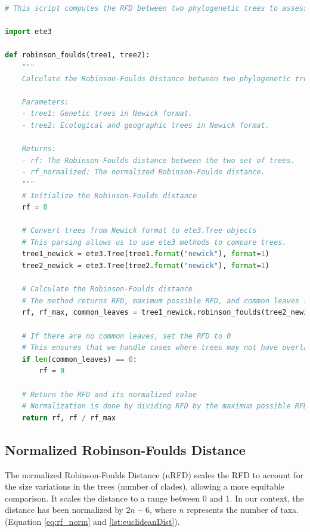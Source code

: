 \begin{lstlisting}[label=lst:robinsonFoulds,language=Python,caption=Python script for calculating the Robinson-Foulds Distance using the ete3 package in the aPhyloGeo package.]
# This script computes the RFD between two phylogenetic trees to assess their topological dissimilarity.

import ete3

def robinson_foulds(tree1, tree2):
    """
    Calculate the Robinson-Foulds Distance between two phylogenetic trees.

    Parameters:
    - tree1: Genetic trees in Newick format.
    - tree2: Ecological and geographic trees in Newick format.

    Returns:
    - rf: The Robinson-Foulds distance between the two set of trees.
    - rf_normalized: The normalized Robinson-Foulds distance.
    """
    # Initialize the Robinson-Foulds distance
    rf = 0

    # Convert trees from Newick format to ete3.Tree objects
    # This parsing allows us to use ete3 methods to compare trees.
    tree1_newick = ete3.Tree(tree1.format("newick"), format=1)
    tree2_newick = ete3.Tree(tree2.format("newick"), format=1)

    # Calculate the Robinson-Foulds distance
    # The method returns RFD, maximum possible RFD, and common leaves (i.e., taxa) between the trees.
    rf, rf_max, common_leaves = tree1_newick.robinson_foulds(tree2_newick, unrooted_trees=True)

    # If there are no common leaves, set the RFD to 0
    # This ensures that we handle cases where trees may not have overlapping taxa.
    if len(common_leaves) == 0:
        rf = 0

    # Return the RFD and its normalized value
    # Normalization is done by dividing RFD by the maximum possible RFD.
    return rf, rf / rf_max
\end{lstlisting}

\subsection{Normalized Robinson-Foulds Distance}\label{RFnorm}

The normalized Robinson-Foulds Distance (nRFD) scales the RFD to account for the size variations in the trees (number of clades), allowing a more equitable comparison. It scales the distance to a range between 0 and 1. In our context, the distance has been normalized by $2n-6$, where $n$ represents the number of taxa. (Equation \eqref{eq:rf_norm} and \autoref{lst:euclideanDist}).

